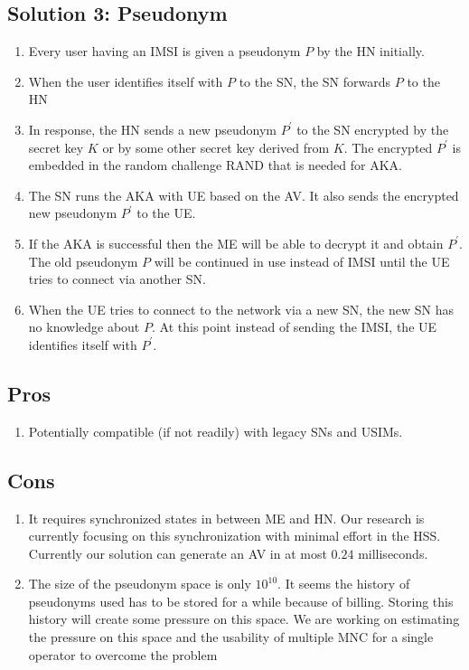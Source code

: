 \documentclass[portrait,a0]{a0poster}
\begin{document}
\begin{multicols}{2}
\section{Solution 3: Pseudonym}
\begin{enumerate}
    \item  Every user having an IMSI is given a pseudonym $P$ by the HN initially.
    \item  When the user identifies itself with $P$ to the SN, the SN forwards $P$ to the HN
    \item In response, the HN sends a new pseudonym $P^{'}$ to the SN encrypted by the secret key $K$ or by some other secret key derived from $K$. The encrypted $P^{'}$ is embedded in the random challenge RAND that is needed for AKA.
    \item The SN runs the AKA with UE based on the AV. It also sends the encrypted new pseudonym $P^{'}$ to the UE.
    \item If the AKA is successful then the ME will be able to decrypt it and obtain $P^{'}$. The old pseudonym $P$ will be continued in use instead of IMSI until the UE tries to connect via another SN. 
    \item  When the UE tries to connect to the network via a new SN, the new SN has no knowledge about $P$. At this point instead of sending the IMSI, the UE identifies itself with $P^{'}$.
\end{enumerate}
\subsection*{Pros}
\begin{enumerate}
\item Potentially compatible (if not readily) with legacy SNs and USIMs.
\end{enumerate}
\subsection*{Cons}
\begin{enumerate}
\item It requires synchronized states in between ME and HN. Our research is currently focusing on this synchronization with minimal effort in the HSS. Currently our solution can generate an AV in at most $0.24$ milliseconds.
\item The size of the pseudonym space is only $10^{10}$. It seems the history of pseudonyms used has to be stored for a while because of billing. Storing this history will create some pressure on this space. We are working on estimating the pressure on this space and the usability of multiple MNC for a single operator to overcome the problem
\end{enumerate}


\end{multicols}
\end{document}
